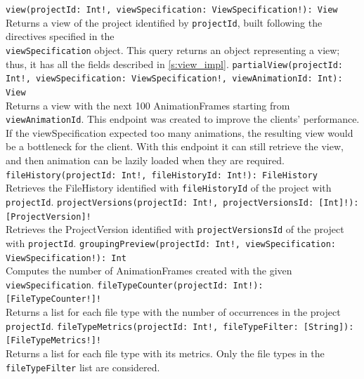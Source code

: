 \bigbreak
\noindent
\verb|view(projectId: Int!, viewSpecification: ViewSpecification!): View| \\
\indent
Returns a view of the project identified by \texttt{projectId}, built following the directives specified in the \\ \texttt{viewSpecification} object. 
This query returns an object representing a view; thus, it has all the fields described in \autoref{s:view_impl}. 
\bigbreak
\noindent
\verb|partialView(projectId: Int!, viewSpecification: ViewSpecification!, viewAnimationId: Int): View| \\
\indent
Returns a view with the next 100 AnimationFrames starting from \texttt{viewAnimationId}. 
This endpoint was created to improve the clients' performance. If the viewSpecification expected too many animations, the resulting view would be a bottleneck for the client.
With this endpoint it can still retrieve the view, and then animation can be lazily loaded when they are required. 
\bigbreak
\noindent
\verb|fileHistory(projectId: Int!, fileHistoryId: Int!): FileHistory| \\
\indent
Retrieves the FileHistory identified with \texttt{fileHistoryId} of the project with \texttt{projectId}.
\bigbreak
\noindent
\verb|projectVersions(projectId: Int!, projectVersionsId: [Int]!): [ProjectVersion]!| \\
\indent
Retrieves the ProjectVersion identified with \texttt{projectVersionsId} of the project with \texttt{projectId}.
\bigbreak
\noindent
\verb|groupingPreview(projectId: Int!, viewSpecification: ViewSpecification!): Int| \\
\indent
Computes the number of AnimationFrames created with the given \texttt{viewSpecification}.
\bigbreak
\noindent
\verb|fileTypeCounter(projectId: Int!): [FileTypeCounter!]!| \\
\indent
Returns a list for each file type with the number of occurrences in the project \texttt{projectId}.
\bigbreak
\noindent
\verb|fileTypeMetrics(projectId: Int!, fileTypeFilter: [String]): [FileTypeMetrics!]!| \\
\indent
Returns a list for each file type with its metrics. Only the file types in the \texttt{fileTypeFilter} list are considered. 

